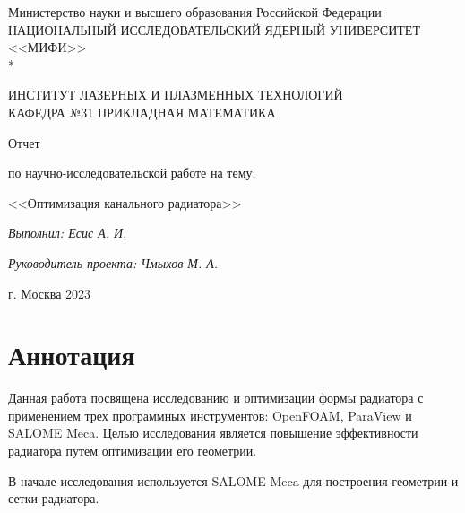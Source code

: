 \documentclass[a4paper,12pt]{article}
\theoremstyle{plain} %
\theoremstyle{definition} %
\theoremstyle{remark} %
\begin{document}
\renewcommand{\contentsname}{\Large Содержание}
\renewcommand{\bibname}{\normalfont\Large\bfseries Список литературы}

\begin{titlepage}
	\begin{center}
		Министерство науки и высшего образования Российской Федерации \\
		НАЦИОНАЛЬНЫЙ ИССЛЕДОВАТЕЛЬСКИЙ ЯДЕРНЫЙ УНИВЕРСИТЕТ <<МИФИ>> \\*
		\hrulefill
	\end{center}
	
	\begin{center}
		ИНСТИТУТ ЛАЗЕРНЫХ И ПЛАЗМЕННЫХ ТЕХНОЛОГИЙ\\
		КАФЕДРА №31 ПРИКЛАДНАЯ МАТЕМАТИКА
	\end{center}
	\vspace{1cm}
	
	\vspace{2em}
	
	\begin{center}
		\large{Отчет}
		
		по научно-исследовательской работе на тему:
	\end{center}
	\begin{center}
		\large <<Оптимизация канального радиатора>>
	\end{center}
	\begin{center}
		\large \textit{Выполнил: Есис А. И.}
		
		\textit{Руководитель проекта: Чмыхов М. А.}
	\end{center}
	
	
	\vspace{22em}
	
	\begin{center}
		г. Москва 2023
	\end{center}
\end{titlepage}

\newpage
\section*{Аннотация}

Данная работа посвящена исследованию и оптимизации формы радиатора с применением трех программных инструментов: OpenFOAM, ParaView и SALOME Meca. Целью исследования является повышение эффективности радиатора путем оптимизации его геометрии.

В начале исследования используется SALOME Meca для построения геометрии и сетки радиатора.
\end{document}
